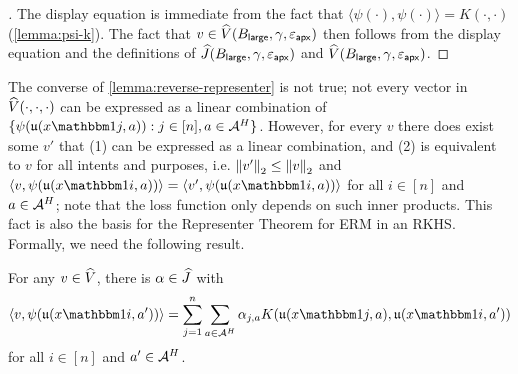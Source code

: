 \begin{proof}[]
The display equation is immediate from the fact that $\langle \psi(\cdot),\psi(\cdot)\rangle = K(\cdot,\cdot)$ (\cref{lemma:psi-k}). The fact that $v \in \widehat{V}(B_{\mathsf{large}},\gamma,\varepsilon_{\mathsf{apx}})$ then follows from the display equation and the definitions of $\widehat{J}(B_{\mathsf{large}},\gamma,\varepsilon_{\mathsf{apx}})$ and $\widehat{V}(B_{\mathsf{large}},\gamma,\varepsilon_{\mathsf{apx}})$. %
\end{proof}

The converse of \cref{lemma:reverse-representer} is not true; not every vector in $\widehat{V}(\cdot,\cdot,\cdot)$ can be expressed as a linear combination of $\{\psi(\uop{x\ind{j}}{a}): j\in[n], a \in \MA^H\}$. However, for every $v$ there does exist some $v'$ that (1) can be expressed as a linear combination, and (2) is equivalent to $v$ for all intents and purposes, i.e. $\left \lVert v' \right \rVert_2 \leq \left \lVert v \right \rVert_2$ and $\langle v,\psi(\uop{x\ind{i}}{a})\rangle = \langle v',\psi(\uop{x\ind{i}}{a})\rangle$ for all $i\in[n]$ and $a \in \mathcal{A}^H$; note that the loss function only depends on such inner products. This fact is also the basis for the Representer Theorem for ERM in an RKHS. Formally, we need the following result.

\begin{lemma}\label{lemma:representer}
For any $v \in \widehat{V}$, there is $\alpha \in \widehat{J}$ with 
\[\langle v, \psi(\uop{x\ind{i}}{a'})\rangle = \sum_{j=1}^n \sum_{a \in \MA^H} \alpha_{j,a} K(\uop{x\ind{j}}{a},\uop{x\ind{i}}{a'})\]
for all $i \in [n]$ and $a' \in \mathcal{A}^H$.
\end{lemma}


